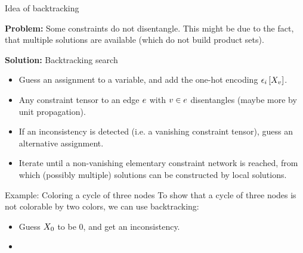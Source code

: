 \documentclass{beamer}
\begin{document}
    \begin{frame}{Idea of backtracking}

        {\bf Problem:} Some constraints do not disentangle.
        This might be due to the fact, that multiple solutions are available (which do not build product sets).
        \medskip

        {\bf Solution:} Backtracking search
        \begin{itemize}
            \item Guess an assignment to a variable, and add the one-hot encoding $\epsilon_{i}\left[X_{v}\right]$.
            \item Any constraint tensor to an edge $e$ with $v\in e$ disentangles (maybe more by unit propagation).
            \item If an inconsistency is detected (i.e. a vanishing constraint tensor), guess an alternative assignment.
            \item Iterate until a non-vanishing elementary constraint network is reached, from which (possibly multiple) solutions can be constructed by local solutions.
        \end{itemize}


%

    \end{frame}

    \begin{frame}{Example: Coloring a cycle of three nodes}
        To show that a cycle of three nodes is not colorable by two colors, we can use backtracking:
        \begin{itemize}
            \item Guess $X_{0}$ to be $0$, and get an inconsistency.
            \item {}
        \end{itemize}
        
    \end{frame}
\end{document}
